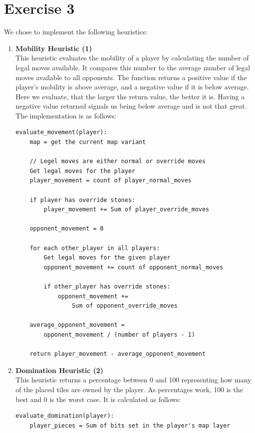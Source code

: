 \section{Exercise 3}

We chose to implement the following heuristics:

\begin{enumerate}
    \item \textbf{Mobility Heuristic (1)} \\
    This heuristic evaluates the mobility of a player by calculating the number of legal moves available. It compares this number to the average number of legal moves available to all opponents. The function returns a positive value if the player's mobility is above average, and a negative value if it is below average. Here we evaluate, that the larger the return value, the better it is. Having a negative value returned signals us being below average and is not that great. The implementation is as follows:
    \begin{lstlisting}
evaluate_movement(player):
    map = get the current map variant

    // Legel moves are either normal or override moves
    Get legal moves for the player
    player_movement = count of player_normal_moves

    if player has override stones:
        player_movement += Sum of player_override_moves

    opponent_movement = 0

    for each other_player in all players:
        Get legal moves for the given player
        opponent_movement += count of opponent_normal_moves

        if other_player has override stones:
            opponent_movement += 
                Sum of opponent_override_moves

    average_opponent_movement = 
        opponent_movement / (number of players - 1)

    return player_movement - average_opponent_movement
    \end{lstlisting} 

    \item \textbf{Domination Heuristic (2)} \\
    This heuristic returns a percentage between 0 and 100 representing how many of the placed tiles are owned by the player. As percentages work, 100 is the best and 0 is the worst case. It is calculated as follows:
    \begin{lstlisting}
evaluate_domination(player):
    player_pieces = Sum of bits set in the player's map layer 


\end{lstlisting}
\end{enumerate}
